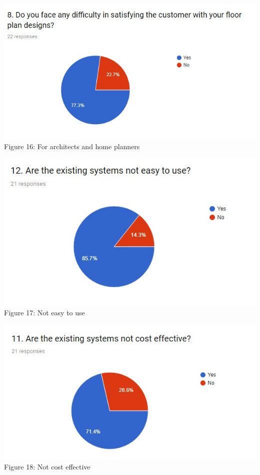 \documentclass{article}
\begin{document}
\begin{center}
\includegraphics[scale=0.7]{graph8}
\\Figure 16: For architects and home planners
\end{center}

\begin{center}
\includegraphics[scale=0.8]{graph12}
\\Figure 17: Not easy to use
\label{fig:five}
\end{center}

\begin{center}
\includegraphics[scale=0.7]{graph11}
\\Figure 18: Not cost effective
\end{center}
\end{document}
